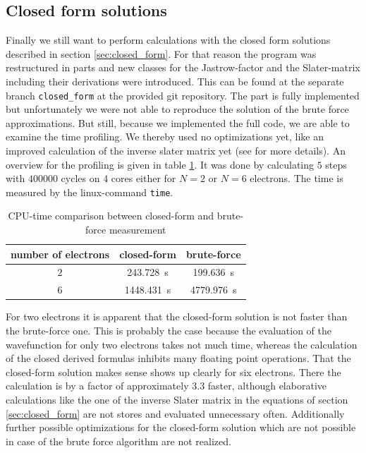 \subsection{Closed form solutions}\label{sec:analytical}
Finally we still want to perform calculations with the closed form solutions described in section \ref{sec:closed_form}. For that reason the program was restructured in parts and new classes for the Jastrow-factor and the Slater-matrix including their derivations were introduced. This can be found at the separate branch \texttt{closed\_form} at the provided git repository. The part is fully implemented but unfortunately we were not able to reproduce the solution of the brute force approximations. But still, because we implemented the full code, we are able to examine the time profiling. We thereby used no optimizations yet, like an improved calculation of the inverse slater matrix yet (see \citet{hogberget2013} for more details). An overview for the profiling is given in table \ref{tab:cpu-time}. It was done by calculating $5$ steps with $400000$ cycles on $4$ cores either for $N=2$ or $N=6$ electrons. The time is measured by the linux-command \texttt{time}.
 \begin{table}[htbp]
    \centering
    \caption{CPU-time comparison between closed-form and brute-force measurement}
    \begin{tabular}{c|cc}
    \toprule
    number of electrons   & closed-form    & brute-force   \\
    \midrule
    $2$     & \SI{243.728}{\second}   & \SI{199.636}{\second}  \\
    $6$     & \SI{1448.431}{\second}  & \SI{4779.976}{\second}  \\
    \bottomrule
    \end{tabular}
    \label{tab:cpu-time}
\end{table}

For two electrons it is apparent that the closed-form solution is not faster than the brute-force one. This is probably the case because the evaluation of the wavefunction for only two electrons takes not much time, whereas the calculation of the closed derived formulas inhibits many floating point operations. That the closed-form solution makes sense shows up clearly for six electrons. There the calculation is by a factor of approximately $3.3$ faster, although elaborative calculations like the one of the inverse Slater matrix in the equations of section \ref{sec:closed_form} are not stores and evaluated unnecessary often. Additionally further possible optimizations for the closed-form solution which are not possible in case of the brute force algorithm are not realized. 

